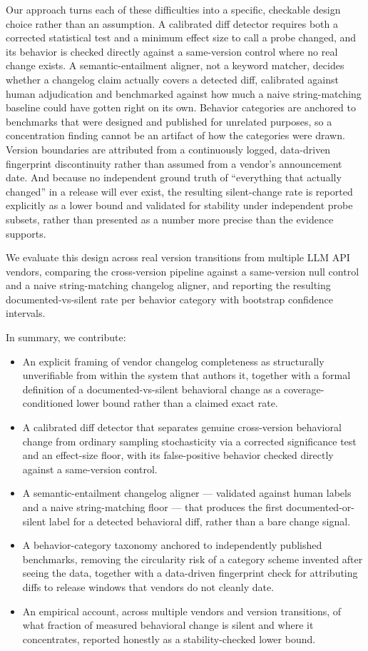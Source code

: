 \documentclass[11pt]{article}
\begin{document}
Our approach turns each of these difficulties into a specific, checkable design choice rather than an assumption. A calibrated diff detector requires both a corrected statistical test and a minimum effect size to call a probe changed, and its behavior is checked directly against a same-version control where no real change exists. A semantic-entailment aligner, not a keyword matcher, decides whether a changelog claim actually covers a detected diff, calibrated against human adjudication and benchmarked against how much a naive string-matching baseline could have gotten right on its own. Behavior categories are anchored to benchmarks that were designed and published for unrelated purposes, so a concentration finding cannot be an artifact of how the categories were drawn. Version boundaries are attributed from a continuously logged, data-driven fingerprint discontinuity rather than assumed from a vendor's announcement date. And because no independent ground truth of ``everything that actually changed'' in a release will ever exist, the resulting silent-change rate is reported explicitly as a lower bound and validated for stability under independent probe subsets, rather than presented as a number more precise than the evidence supports.

We evaluate this design across real version transitions from multiple LLM API vendors, comparing the cross-version pipeline against a same-version null control and a naive string-matching changelog aligner, and reporting the resulting documented-vs-silent rate per behavior category with bootstrap confidence intervals.

In summary, we contribute:
\begin{itemize}[leftmargin=1.4em]
\item An explicit framing of vendor changelog completeness as structurally unverifiable from within the system that authors it, together with a formal definition of a documented-vs-silent behavioral change as a coverage-conditioned lower bound rather than a claimed exact rate.
\item A calibrated diff detector that separates genuine cross-version behavioral change from ordinary sampling stochasticity via a corrected significance test and an effect-size floor, with its false-positive behavior checked directly against a same-version control.
\item A semantic-entailment changelog aligner --- validated against human labels and a naive string-matching floor --- that produces the first documented-or-silent label for a detected behavioral diff, rather than a bare change signal.
\item A behavior-category taxonomy anchored to independently published benchmarks, removing the circularity risk of a category scheme invented after seeing the data, together with a data-driven fingerprint check for attributing diffs to release windows that vendors do not cleanly date.
\item An empirical account, across multiple vendors and version transitions, of what fraction of measured behavioral change is silent and where it concentrates, reported honestly as a stability-checked lower bound.
\end{itemize}
\end{document}
